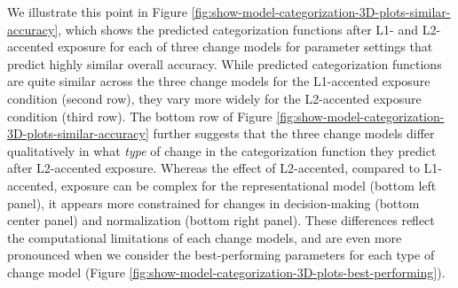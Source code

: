\documentclass[
  11pt,
  english,
  man,floatsintext]{apa6}
\begin{document}
We illustrate this point in Figure \ref{fig:show-model-categorization-3D-plots-similar-accuracy}, which shows the predicted categorization functions after L1- and L2-accented exposure for each of three change models for parameter settings that predict highly similar overall accuracy. While predicted categorization functions are quite similar across the three change models for the L1-accented exposure condition (second row), they vary more widely for the L2-accented exposure condition (third row). The bottom row of Figure \ref{fig:show-model-categorization-3D-plots-similar-accuracy} further suggests that the three change models differ qualitatively in what \emph{type} of change in the categorization function they predict after L2-accented exposure. Whereas the effect of L2-accented, compared to L1-accented, exposure can be complex for the representational model (bottom left panel), it appears more constrained for changes in decision-making (bottom center panel) and normalization (bottom right panel). These differences reflect the computational limitations of each change models, and are even more pronounced when we consider the best-performing parameters for each type of change model (Figure \ref{fig:show-model-categorization-3D-plots-best-performing}).
\end{document}

